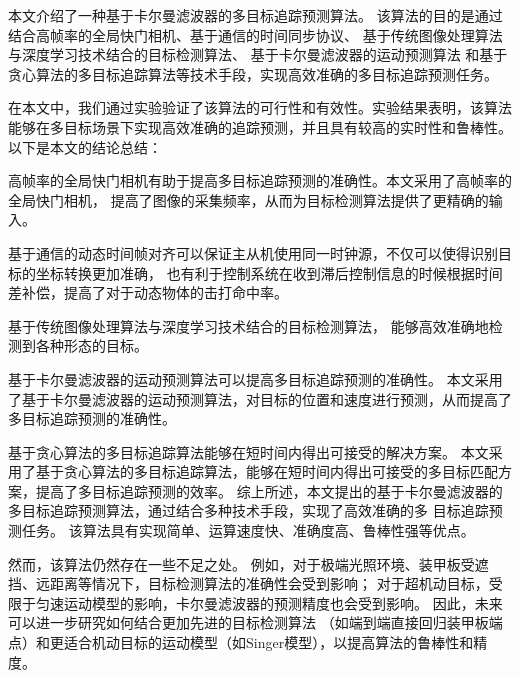 


\begin{conclusions}

本文介绍了一种基于卡尔曼滤波器的多目标追踪预测算法。
该算法的目的是通过结合高帧率的全局快门相机、基于通信的时间同步协议、
基于传统图像处理算法与深度学习技术结合的目标检测算法、
基于卡尔曼滤波器的运动预测算法
和基于贪心算法的多目标追踪算法等技术手段，实现高效准确的多目标追踪预测任务。

在本文中，我们通过实验验证了该算法的可行性和有效性。实验结果表明，该算法能够在多目标场景下实现高效准确的追踪预测，并且具有较高的实时性和鲁棒性。以下是本文的结论总结：


高帧率的全局快门相机有助于提高多目标追踪预测的准确性。本文采用了高帧率的全局快门相机，
提高了图像的采集频率，从而为目标检测算法提供了更精确的输入。

基于通信的动态时间帧对齐可以保证主从机使用同一时钟源，不仅可以使得识别目标的坐标转换更加准确，
也有利于控制系统在收到滞后控制信息的时候根据时间差补偿，提高了对于动态物体的击打命中率。

基于传统图像处理算法与深度学习技术结合的目标检测算法，
能够高效准确地检测到各种形态的目标。

基于卡尔曼滤波器的运动预测算法可以提高多目标追踪预测的准确性。
本文采用了基于卡尔曼滤波器的运动预测算法，对目标的位置和速度进行预测，从而提高了多目标追踪预测的准确性。

基于贪心算法的多目标追踪算法能够在短时间内得出可接受的解决方案。
本文采用了基于贪心算法的多目标追踪算法，能够在短时间内得出可接受的多目标匹配方案，提高了多目标追踪预测的效率。
综上所述，本文提出的基于卡尔曼滤波器的多目标追踪预测算法，通过结合多种技术手段，实现了高效准确的多
目标追踪预测任务。
该算法具有实现简单、运算速度快、准确度高、鲁棒性强等优点。

然而，该算法仍然存在一些不足之处。
例如，对于极端光照环境、装甲板受遮挡、远距离等情况下，目标检测算法的准确性会受到影响；
对于超机动目标，受限于匀速运动模型的影响，卡尔曼滤波器的预测精度也会受到影响。
因此，未来可以进一步研究如何结合更加先进的目标检测算法
（如端到端直接回归装甲板端点）和更适合机动目标的运动模型（如Singer\cite{2013A}模型），以提高算法的鲁棒性和精度。



\end{conclusions}

